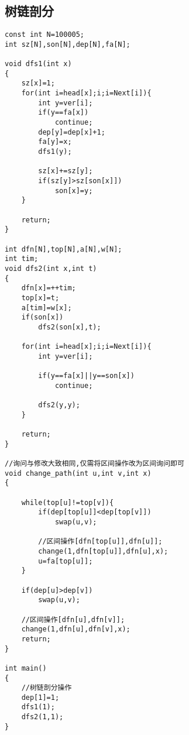 \documentclass[twocolumn,a4]{article}
\begin{document}
\subsection{树链剖分}
\begin{lstlisting}
const int N=100005;
int sz[N],son[N],dep[N],fa[N];

void dfs1(int x)
{
    sz[x]=1;
    for(int i=head[x];i;i=Next[i]){
        int y=ver[i];
        if(y==fa[x])
            continue;
        dep[y]=dep[x]+1;
        fa[y]=x;
        dfs1(y);
        
        sz[x]+=sz[y];
        if(sz[y]>sz[son[x]])
            son[x]=y;
    }
    
    return;
}

int dfn[N],top[N],a[N],w[N];
int tim;
void dfs2(int x,int t)
{
    dfn[x]=++tim;
    top[x]=t;
    a[tim]=w[x];
    if(son[x])
        dfs2(son[x],t);
    
    for(int i=head[x];i;i=Next[i]){
        int y=ver[i];
        
        if(y==fa[x]||y==son[x])
            continue;
            
        dfs2(y,y);
    }
    
    return;
}

//询问与修改大致相同,仅需将区间操作改为区间询问即可
void change_path(int u,int v,int x)
{

    while(top[u]!=top[v]){
        if(dep[top[u]]<dep[top[v]])
            swap(u,v);
        
        //区间操作[dfn[top[u]],dfn[u]];
        change(1,dfn[top[u]],dfn[u],x);
        u=fa[top[u]];
    }
    
    if(dep[u]>dep[v])
        swap(u,v);

    //区间操作[dfn[u],dfn[v]]; 
    change(1,dfn[u],dfn[v],x);
    return;
}

int main()
{
    //树链剖分操作
    dep[1]=1;
    dfs1(1);
    dfs2(1,1);
}
\end{lstlisting}
\end{document}
